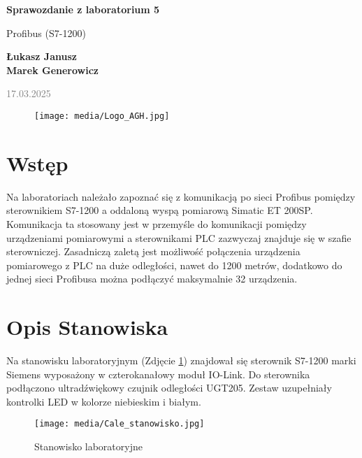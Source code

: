 \documentclass{article}
\begin{document}
\begin{titlepage}
    \begin{center}
        \vspace*{1cm}
            
        \Huge
        \textbf{Sprawozdanie z laboratorium 5}
            
        \vspace{0.5cm}
        \LARGE
        Profibus (S7-1200) 
            
        \vspace{1.5cm}
            
        \textbf{Łukasz Janusz\\Marek Generowicz}

        \normalsize      
        \textcolor{gray}{17.03.2025}
        \vfill
        \begin{figure}[hb]
            \centering
            \texttt{[image: media/Logo\_AGH.jpg]}
        \end{figure}   
    \end{center}
\end{titlepage}

\section{Wstęp}
Na laboratoriach należało zapoznać się z komunikacją po sieci Profibus pomiędzy sterownikiem S7-1200 a oddaloną wyspą pomiarową Simatic ET 200SP. Komunikacja ta stosowany jest w przemyśle do komunikacji pomiędzy urządzeniami pomiarowymi a sterownikami PLC zazwyczaj znajduje się w szafie sterowniczej. Zasadniczą zaletą jest możliwość połączenia urządzenia pomiarowego z PLC na duże odległości, nawet do 1200 metrów, dodatkowo do jednej sieci Profibusa można podłączyć maksymalnie 32 urządzenia.

\section{Opis Stanowiska}
Na stanowisku laboratoryjnym (Zdjęcie \ref{fig:stanowisko}) znajdował się sterownik S7-1200 marki Siemens wyposażony w czterokanałowy moduł IO-Link. Do sterownika podłączono ultradźwiękowy czujnik odległości UGT205. Zestaw uzupełniały kontrolki LED w kolorze niebieskim i białym. 

\begin{figure}[H]
    \centering
    \texttt{[image: media/Cale\_stanowisko.jpg]}
    \caption{Stanowisko laboratoryjne}
    \label{fig:stanowisko}
\end{figure}
\end{document}
